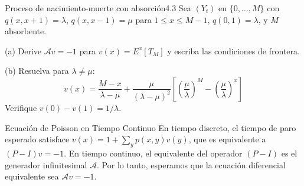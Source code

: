 \documentclass[10pt,a4paper]{article}
\begin{document}
\begin{ejercicio}{Proceso de nacimiento-muerte con absorción}{4.3}
    Sea $(Y_t)$ en $\{0, \dots, M\}$ con $q(x, x+1) = \lambda$, $q(x, x-1) = \mu$ para $1 \le x \le M-1$, $q(0, 1) = \lambda$, y $M$ absorbente.
    
    (a) Derive $\mathcal{A}v = -1$ para $v(x) = E^x[T_M]$ y escriba las condiciones de frontera.
    
    (b) Resuelva para $\lambda \neq \mu$:
    \[ v(x) = \frac{M-x}{\lambda-\mu} + \frac{\mu}{(\lambda-\mu)^2} \left[ \left(\frac{\mu}{\lambda}\right)^M - \left(\frac{\mu}{\lambda}\right)^x \right] \]
    Verifique $v(0) - v(1) = 1/\lambda$.
\end{ejercicio}

\vspace{2mm}

\begin{nota}{Ecuación de Poisson en Tiempo Continuo}
    En tiempo discreto, el tiempo de paro esperado satisface $v(x) = 1 + \sum_y p(x,y)v(y)$, que es equivalente a $(P-I)v = -1$. En tiempo continuo, el equivalente del operador $(P-I)$ es el generador infinitesimal $\mathcal{A}$. Por lo tanto, esperamos que la ecuación diferencial equivalente sea $\mathcal{A}v = -1$.
\end{nota}
\end{document}
